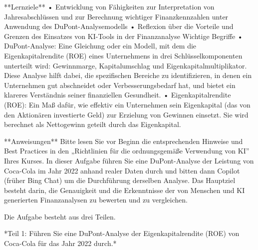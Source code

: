 \documentclass[
  ngerman,
  letterpaper,
  DIV=11]{scrreprt}
\newenvironment{Shaded}{\begin{snugshade}}{\end{snugshade}}
\newcommand{\NormalTok}[1]{\textcolor[rgb]{0.00,0.23,0.31}{#1}}
\begin{document}
\begin{tcolorbox}[enhanced jigsaw, left=2mm, bottomrule=.15mm, arc=.35mm, rightrule=.15mm, colframe=quarto-callout-note-color-frame, coltitle=black, colback=white, toprule=.15mm, toptitle=1mm, colbacktitle=quarto-callout-note-color!10!white, title=\textcolor{quarto-callout-note-color}{\faInfo}\hspace{0.5em}{Copilot-Aufgabe: Dupont-Analyse}, opacitybacktitle=0.6, leftrule=.75mm, bottomtitle=1mm, titlerule=0mm, opacityback=0, breakable]

\begin{Shaded}
\begin{Highlighting}[]

\NormalTok{**Lernziele**}
\NormalTok{•   Entwicklung von Fähigkeiten zur Interpretation von Jahresabschlüssen und zur Berechnung wichtiger Finanzkennzahlen unter Anwendung des DuPont{-}Analysemodells}
\NormalTok{•   Reflexion über die Vorteile und Grenzen des Einsatzes von KI{-}Tools in der Finanzanalyse}
\NormalTok{Wichtige Begriffe}
\NormalTok{•   DuPont{-}Analyse: Eine Gleichung oder ein Modell, mit dem die Eigenkapitalrendite (ROE) eines Unternehmens in drei Schlüsselkomponenten unterteilt wird: Gewinnmarge, Kapitalumschlag und Eigenkapitalmultiplikator. Diese Analyse hilft dabei, die spezifischen Bereiche zu identifizieren, in denen ein Unternehmen gut abschneidet oder Verbesserungsbedarf hat, und bietet ein klareres Verständnis seiner finanziellen Gesundheit.}
\NormalTok{•   Eigenkapitalrendite (ROE): Ein Maß dafür, wie effektiv ein Unternehmen sein Eigenkapital (das von den Aktionären investierte Geld) zur Erzielung von Gewinnen einsetzt. Sie wird berechnet als Nettogewinn geteilt durch das Eigenkapital.}

\NormalTok{**Anweisungen**}
\NormalTok{Bitte lesen Sie vor Beginn die entsprechenden Hinweise und Best Practices in den „Richtlinien für die ordnungsgemäße Verwendung von KI” Ihres Kurses. In dieser Aufgabe führen Sie eine DuPont{-}Analyse der Leistung von Coca{-}Cola im Jahr 2022 anhand realer Daten durch und bitten dann Copilot (früher Bing Chat) um die Durchführung derselben Analyse. Das Hauptziel besteht darin, die Genauigkeit und die Erkenntnisse der von Menschen und KI generierten Finanzanalysen zu bewerten und zu vergleichen. }

\NormalTok{Die Aufgabe besteht aus drei Teilen.}

\NormalTok{*Teil 1: Führen Sie eine DuPont{-}Analyse der Eigenkapitalrendite (ROE) von Coca{-}Cola für das Jahr 2022 durch.*}


\end{Highlighting}
\end{Shaded}
\end{tcolorbox}
\end{document}
